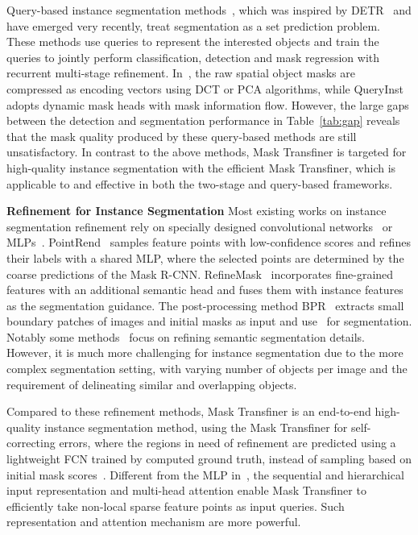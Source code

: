 \documentclass[10pt,twocolumn,letterpaper]{article}
\newcommand{\parsection}[1]{\vspace{1mm}\noindent\textbf{#1}}
\begin{document}
Query-based instance segmentation methods~\cite{QueryInst,dong2021solq,wang2020end,hu2021ISTR},
which was inspired by DETR~\cite{carion2020end} and have emerged very recently, treat segmentation as a set prediction problem.
These methods use queries to represent the interested objects and train the queries to jointly perform classification, detection and mask regression with recurrent multi-stage refinement. In~\cite{dong2021solq,hu2021ISTR}, the raw spatial object masks are compressed as encoding vectors using DCT or PCA algorithms, while QueryInst~\cite{QueryInst} adopts dynamic mask heads with mask information flow. However, the large gaps between the detection and segmentation performance in Table~\ref{tab:gap} reveals that the mask quality produced by these query-based methods are still unsatisfactory. In contrast to the above methods, Mask Transfiner is targeted for high-quality instance segmentation with the efficient Mask Transfiner, which is applicable to  and effective in both the two-stage and query-based frameworks. 


\parsection{Refinement for Instance Segmentation} Most existing works on instance segmentation refinement rely on specially designed convolutional networks~\cite{tang2021look,refinemask} or MLPs~\cite{kirillov2020pointrend}. PointRend~\cite{kirillov2020pointrend} samples feature points with low-confidence scores and refines their labels with a shared MLP, where the selected points are determined by the coarse predictions of the Mask R-CNN. RefineMask~\cite{refinemask} incorporates fine-grained features with an additional semantic head and fuses them with instance features as the segmentation guidance. 
The post-processing method BPR~\cite{tang2021look} extracts small boundary patches of images and initial masks as input and use~\cite{wang2020deep} for segmentation. Notably some methods~\cite{takikawa2019gated,wang2020deep,yuan2020segfix,cheng2020cascadepsp} focus on refining semantic segmentation details. However, it is much more challenging for instance segmentation due to the more complex segmentation setting, with varying number of objects per image and the requirement of delineating similar and overlapping objects.   

Compared to these refinement methods, Mask Transfiner is an end-to-end high-quality instance segmentation method, using the Mask Transfiner for self-correcting errors, where the regions in need of refinement are predicted using a lightweight FCN trained by computed ground truth, instead of sampling based on initial mask scores~\cite{kirillov2020pointrend}. Different from the MLP in~\cite{kirillov2020pointrend}, the sequential and hierarchical input representation and multi-head attention enable Mask Transfiner to efficiently take non-local sparse feature points as input queries. Such representation and attention mechanism are more powerful.
\end{document}
